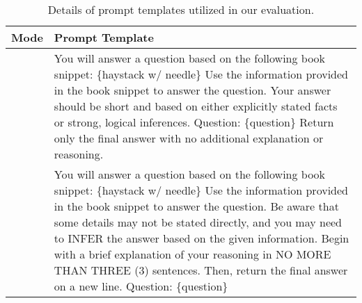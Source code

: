 \begin{table*}[h]
    \small
    \centering
    \begin{tabular}{>{\centering\arraybackslash}m{3cm}>{\RaggedRight\arraybackslash}p{10cm}}
    \toprule
    \textbf{Mode} & \textbf{Prompt Template} \\ \midrule
    \multirow{10}{*}{w/o CoT} & You will answer a question based on the following book snippet: \newline\vspace{0.3cm} \{haystack w/ needle\}\newline\vspace{0.3cm} Use the information provided in the book snippet to answer the question. Your answer should be short and based on either explicitly stated facts or strong, logical inferences.\newline\vspace{0.3cm} Question: \{question\}\newline\vspace{0.3cm} Return only the final answer with no additional explanation or reasoning. \\ \midrule
    \multirow{10}{*}{w/ CoT} & You will answer a question based on the following book snippet:\newline\vspace{0.3cm} \{haystack w/ needle\} \newline\vspace{0.3cm} Use the information provided in the book snippet to answer the question. Be aware that some details may not be stated directly, and you may need to INFER the answer based on the given information. Begin with a brief explanation of your reasoning in NO MORE THAN THREE (3) sentences. Then, return the final answer on a new line.\newline\vspace{0.3cm} Question: \{question\} \\
    \bottomrule
    \end{tabular}
    \caption{Details of prompt templates utilized in our evaluation.}
    \label{tab:prompt_templates}
\end{table*}
